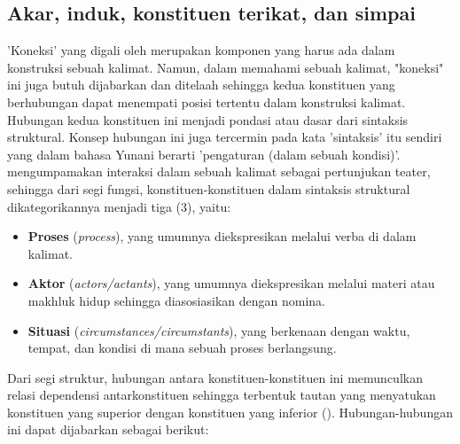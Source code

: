 \subsection{Akar, induk, konstituen terikat, dan simpai}
'Koneksi' yang digali oleh \cite{tesniere1959elements} merupakan komponen yang harus ada dalam konstruksi sebuah kalimat. Namun, dalam memahami sebuah kalimat, "koneksi" ini juga butuh dijabarkan dan ditelaah sehingga kedua konstituen yang berhubungan dapat menempati posisi tertentu dalam konstruksi kalimat. Hubungan kedua konstituen ini menjadi pondasi atau dasar dari sintaksis struktural. Konsep hubungan ini juga tercermin pada kata 'sintaksis' itu sendiri yang dalam bahasa Yunani berarti 'pengaturan (dalam sebuah kondisi)'. \cite{tesniere1959elements} mengumpamakan interaksi dalam sebuah kalimat sebagai pertunjukan teater, sehingga dari segi fungsi, konstituen-konstituen dalam sintaksis struktural dikategorikannya menjadi tiga (3), yaitu:
\begin{itemize}
\item \textbf{Proses} (\textit{process}), yang umumnya diekspresikan melalui verba di dalam kalimat.
\item \textbf{Aktor} (\textit{actors/actants}), yang umumnya diekspresikan melalui materi atau makhluk hidup sehingga diasosiasikan dengan nomina.
\item \textbf{Situasi} (\textit{circumstances/circumstants}), yang berkenaan dengan waktu, tempat, dan kondisi di mana sebuah proses berlangsung.
\end{itemize}
Dari segi struktur, hubungan antara konstituen-konstituen ini memunculkan relasi dependensi antarkonstituen sehingga terbentuk tautan yang menyatukan konstituen yang superior dengan konstituen yang inferior (\citealp{tesniere1959elements, hudson2010introduction, heringer1993dependency}). Hubungan-hubungan ini dapat dijabarkan sebagai berikut:

